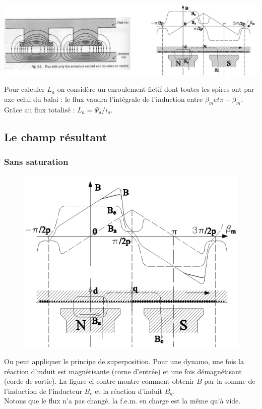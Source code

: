 		\begin{center}
		\includegraphics[scale=0.35]{ch4/image13.png}
		\end{center}
	
	Pour calculer $L_a$ on considère un enroulement fictif dont toutes 
	les spires ont par axe celui du balai : le flux vaudra l'intégrale 
	de l'induction entre $\beta_m et \pi-\beta_m$. Grâce au flux 
	totalisé : $L_a=\Psi_a/i_a$.
	
	\subsection{Le champ résultant}
		\subsubsection{Sans saturation}
		\begin{figure}
	\vspace{-25mm}
	\includegraphics[scale=0.34]{ch4/image14.png}
	\end{figure}
		On peut appliquer le principe de superposition. Pour une dynamo, 
		une fois la réaction d'induit est magnétisante (corne d'entrée) 
		et une fois démagnétisant (corde de sortie). La figure ci-contre 
		montre comment obtenir $B$ par la somme de l'induction de l'inducteur 
		$B_e$ et la réaction d'induit $B_a$.\\
		Notons que le flux n'a pas changé, la f.e.m. en charge est la 
		même qu'à vide.
		
